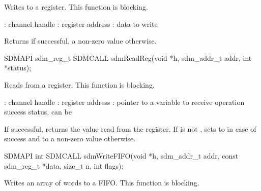 \documentclass[a4paper,12pt,twoside,extrafontsizes]{memoir}
\begin{document}
\begin{funcdescr}
	Writes to a register. This function is blocking.
\end{funcdescr}

\begin{funcparams}
	: channel handle
	: register address
	: data to write
\end{funcparams}

\begin{funcret}
	Returns  if successful, a non-zero value otherwise.
\end{funcret}



\begin{cfuncprototype}
SDMAPI sdm_reg_t SDMCALL sdmReadReg(void *h, sdm_addr_t addr, int *status);
\end{cfuncprototype}

\begin{funcdescr}
	Reads from a register. This function is blocking.
\end{funcdescr}

\begin{funcparams}
	: channel handle
	: register address
	: pointer to a variable to receive operation success status, can be 
\end{funcparams}

\begin{funcret}
	If successful, returns the value read from the register. If  is not , sets  to  in case of success and to a non-zero value otherwise.
\end{funcret}



\begin{cfuncprototype}
SDMAPI int SDMCALL sdmWriteFIFO(void *h, sdm_addr_t addr, const sdm_reg_t *data, size_t n, int flags);
\end{cfuncprototype}

\begin{funcdescr}
	Writes an array of words to a FIFO. This function is blocking.
\end{funcdescr}
\end{document}
